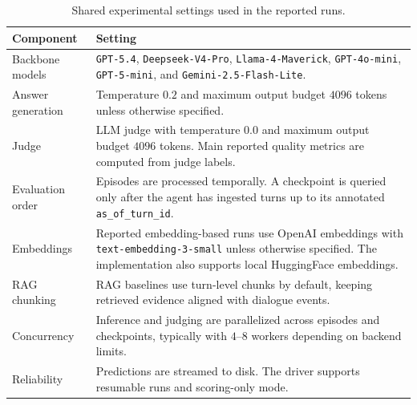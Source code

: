 \begin{table}[t]
\centering
\caption{Shared experimental settings used in the reported runs.}
\label{tab:experiment-settings}
\vspace{-3pt}
\begingroup
\footnotesize
\setlength{\tabcolsep}{4.5pt}
\renewcommand{\arraystretch}{1.12}
\begin{tabularx}{\columnwidth}{
@{}
>{\raggedright\arraybackslash}p{}
>{\raggedright\arraybackslash}X
@{}}
\toprule
\rowcolor{black!6}
\textbf{Component} & \textbf{Setting} \\
\midrule

Backbone models
& \texttt{GPT-5.4}, \texttt{Deepseek-V4-Pro}, \texttt{Llama-4-Maverick}, \texttt{GPT-4o-mini}, \texttt{GPT-5-mini}, and \texttt{Gemini-2.5-Flash-Lite}. \\

Answer generation
& Temperature $0.2$ and maximum output budget $4096$ tokens unless otherwise specified. \\

Judge
& LLM judge with temperature $0.0$ and maximum output budget $4096$ tokens. Main reported quality metrics are computed from judge labels. \\

Evaluation order
& Episodes are processed temporally. A checkpoint is queried only after the agent has ingested turns up to its annotated \texttt{as\_of\_turn\_id}. \\

Embeddings
& Reported embedding-based runs use OpenAI embeddings with \texttt{text-embedding-3-small} unless otherwise specified. The implementation also supports local HuggingFace embeddings. \\

RAG chunking
& RAG baselines use turn-level chunks by default, keeping retrieved evidence aligned with dialogue events. \\

Concurrency
& Inference and judging are parallelized across episodes and checkpoints, typically with $4$--$8$ workers depending on backend limits. \\

Reliability
& Predictions are streamed to disk. The driver supports resumable runs and scoring-only mode. \\

\bottomrule
\end{tabularx}
\endgroup
\end{table}

